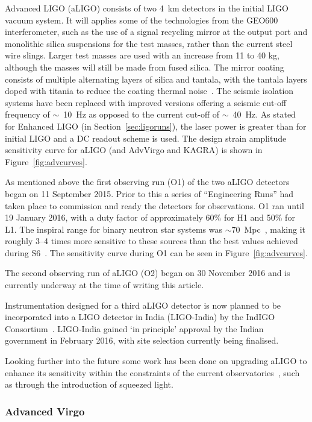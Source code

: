 Advanced LIGO (aLIGO) consists of two 4~km detectors in the initial LIGO vacuum system. It will applies some of the
technologies from the GEO600 interferometer, such as the use of a signal recycling mirror at the output port
and monolithic silica suspensions for the test masses, rather than the current steel wire slings. Larger test
masses are used with an increase from 11 to 40 kg, although the masses will still be made from fused silica.
The mirror coating consists of multiple alternating layers of silica and
tantala, with the tantala layers doped with titania to reduce the coating
thermal noise~\cite{Agresti:2006}. The seismic isolation systems have been
replaced with improved versions offering a seismic cut-off frequency of $\sim$~10~Hz as opposed to the current cut-off of $\sim$~40~Hz. As
stated for Enhanced LIGO (in Section~\ref{sec:ligoruns}), the laser power is greater than for initial LIGO and a DC readout scheme
is used. The design strain amplitude sensitivity curve for aLIGO (and AdvVirgo and KAGRA) is shown
in Figure~\ref{fig:advcurves}.

As mentioned above the first observing run (O1) of the two aLIGO detectors began on 11 September 2015. Prior to
this a series of ``Engineering Runs'' had taken place to commission and ready the detectors for observations.
O1 ran until 19 January 2016, with a duty factor of approximately 60\% for H1 and 50\% for L1. The inspiral range for
binary neutron star systems was $\sim 70$~Mpc~\cite{2016ApJ...832L..21A}, making it roughly 3--4 times more sensitive
to these sources than the best values achieved during S6~\cite{2012PhRvD..85h2002A}. The sensitivity curve during O1
can be seen in Figure~\ref{fig:advcurves}.

The second observing run of aLIGO (O2) began on 30 November 2016 and is currently underway at the time of writing this
article.

Instrumentation designed for a third aLIGO detector is now planned to be incorporated into
a LIGO detector in India (LIGO-India) by the IndIGO Consortium~\cite{LIGOIndia, 2013IJMPD..2241010U}. LIGO-India
gained `in principle' approval by the Indian government in February 2016, with site selection
currently being finalised.

Looking further into the future some work has been done on upgrading aLIGO to enhance its sensitivity within
the constraints of the current observatories~\cite{2015PhRvD..91f2005M}, such as through the introduction
of squeezed light.

\subsubsection{Advanced Virgo}

